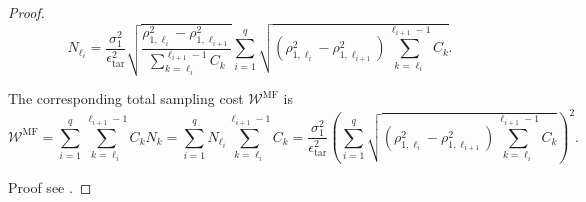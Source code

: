 \begin{proof}
\[
N_{\ell_i} = \frac{\sigma_1^2}{\epsilon_{\text{tar}}^2}\sqrt{\frac{\rho_{1,\ell_i}^2-\rho_{1,\ell_{i+1}}^2}{\sum_{k=\ell_i}^{\ell_{i+1}-1} C_{k}}}  \sum_{i=1}^{q} \sqrt{\left(\rho_{1,\ell_i}^2-\rho_{1,\ell_{i+1}}^2\right)\sum_{k=\ell_i}^{\ell_{i+1}-1} C_{k}}.
\]

The corresponding total sampling cost $\mathcal{W}^\text{MF}$ is
\[
\mathcal{W}^\text{MF} = \sum_{i=1}^q \sum_{k=\ell_i}^{\ell_{i+1}-1} C_k N_k = \sum_{i=1}^q N_{\ell_i}\sum_{k=\ell_i}^{\ell_{i+1}-1} C_k =\frac{\sigma_1^2}{\epsilon_{\text{tar}}^2}\left(\sum_{i=1}^{q} \sqrt{\left(\rho_{1,\ell_i}^2-\rho_{1,\ell_{i+1}}^2\right)\sum_{k=\ell_i}^{\ell_{i+1}-1} C_{k}}\right)^2.
\]

 Proof see \cite[Lemma~A.3]{PeWiGu:2016}.
\end{proof}
%




